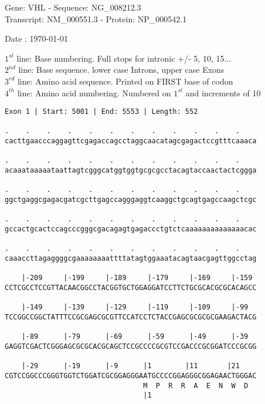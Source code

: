 \documentclass{article}
\begin{document}
\begin{center}
\begin{large}
Gene: VHL - Sequence: NG\_008212.3\\
Transcript: NM\_000551.3 - Protein: NP\_000542.1
 
 Date : \today
\end{large}
\end{center}
$1^{st}$ line: Base numbering. Full stops for intronic +/- 5, 10, 15...\\
$2^{nd}$ line: Base sequence. lower case Introns, upper case Exons\\
$3^{rd}$ line: Amino acid sequence. Printed on FIRST base of codon\\
$4^{th}$ line: Amino acid numbering. Numbered on $1^{st}$ and increments of 10\\
\begin{Verbatim}
Exon 1 | Start: 5001 | End: 5553 | Length: 552
 
.    .    .    .    .    .    .    .    .    .    .    .    
cacttgaacccaggagttcgagaccagcctaggcaacatagcgagactccgtttcaaaca
  
.    .    .    .    .    .    .    .    .    .    .    .    
acaaataaaaataattagtcgggcatggtggtgcgcgcctacagtaccaactactcggga
  
.    .    .    .    .    .    .    .    .    .    .    .    
ggctgaggcgagacgatcgcttgagccagggaggtcaaggctgcagtgagccaagctcgc
  
.    .    .    .    .    .    .    .    .    .    .    .    
gccactgcactccagcccgggcgacagagtgagaccctgtctcaaaaaaaaaaaaaacac
  
.    .    .    .    .    .    .    .    .    .    .    .    
caaaccttagaggggcgaaaaaaaattttatagtggaaatacagtaacgagttggcctag
  
    |-209     |-199     |-189     |-179     |-169     |-159 
CCTCGCCTCCGTTACAACGGCCTACGGTGCTGGAGGATCCTTCTGCGCACGCGCACAGCC
  
    |-149     |-139     |-129     |-119     |-109     |-99  
TCCGGCCGGCTATTTCCGCGAGCGCGTTCCATCCTCTACCGAGCGCGCGCGAAGACTACG
  
    |-89      |-79      |-69      |-59      |-49      |-39  
GAGGTCGACTCGGGAGCGCGCACGCAGCTCCGCCCCGCGTCCGACCCGCGGATCCCGCGG
  
    |-29      |-19      |-9      |1        |11       |21    
CGTCCGGCCCGGGTGGTCTGGATCGCGGAGGGAATGCCCCGGAGGGCGGAGAACTGGGAC
                                 M  P  R  R  A  E  N  W  D  
                                 |1                         
  

\end{Verbatim}
\end{document}
